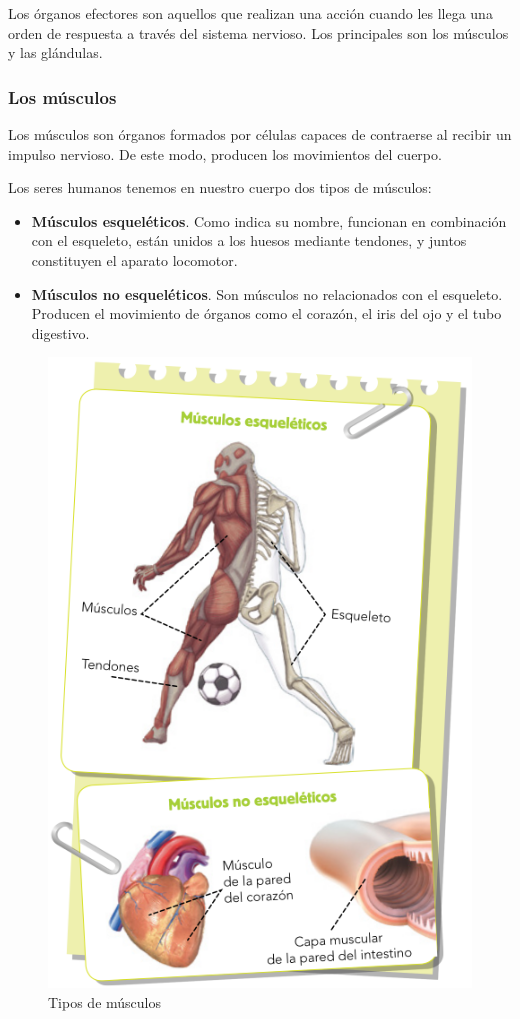 Los órganos efectores son aquellos que realizan una acción cuando les llega una orden de respuesta a través del sistema nervioso. Los principales son los músculos y las glándulas.

\subsubsection{Los músculos}

Los músculos son órganos formados por células capaces de contraerse al recibir un impulso nervioso. De este modo, producen los movimientos del cuerpo.

\vspace{3mm}
Los seres humanos tenemos en nuestro cuerpo dos tipos de músculos:

\begin{itemize}
    \item \textbf{Músculos esqueléticos}. Como indica su nombre, funcionan en combinación con el esqueleto, están unidos a los huesos mediante tendones, y juntos constituyen el aparato locomotor. 
    \item \textbf{Músculos no esqueléticos}. Son músculos no relacionados con el esqueleto. Producen el movimiento de órganos como el corazón, el iris del ojo y el tubo digestivo.
\end{itemize}

\begin{figure}[!ht]
    \centering
    \includegraphics[width=0.5\linewidth]{Tema3/14_Musculos.png}
    \caption{Tipos de músculos}
    \label{fig:musculos}
\end{figure}


